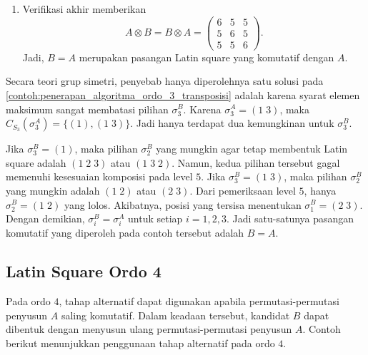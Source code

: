 \begin{contoh}
\begin{enumerate}
    \item Verifikasi akhir memberikan
          \[
            A\otimes B
            =
            B\otimes A
            =
            \begin{pmatrix}
              6 & 5 & 5 \\
              5 & 6 & 5 \\
              5 & 5 & 6
            \end{pmatrix}.
          \]
          Jadi, $B=A$ merupakan pasangan Latin square yang komutatif dengan $A$.
  \end{enumerate}
\end{contoh}

Secara teori grup simetri, penyebab hanya diperolehnya satu solusi pada \autoref{contoh:penerapan_algoritma_ordo_3_transposisi} adalah karena syarat elemen maksimum sangat membatasi pilihan $\sigma_3^B$. Karena $\sigma_3^A=(1\;3)$, maka $C_{S_3}(\sigma_3^A)=\{(1),(1\;3)\}$. Jadi hanya terdapat dua kemungkinan untuk $\sigma_3^B$.

Jika $\sigma_3^B=(1)$, maka pilihan $\sigma_2^B$ yang mungkin agar tetap membentuk Latin square adalah $(1\;2\;3)$ atau $(1\;3\;2)$. Namun, kedua pilihan tersebut gagal memenuhi kesesuaian komposisi pada level $5$. Jika $\sigma_3^B=(1\;3)$, maka pilihan $\sigma_2^B$ yang mungkin adalah $(1\;2)$ atau $(2\;3)$. Dari pemeriksaan level $5$, hanya $\sigma_2^B=(1\;2)$ yang lolos. Akibatnya, posisi yang tersisa menentukan $\sigma_1^B=(2\;3)$. Dengan demikian, $\sigma_i^B=\sigma_i^A$ untuk setiap $i=1,2,3$. Jadi satu-satunya pasangan komutatif yang diperoleh pada contoh tersebut adalah $B=A$.

\subsection{Latin Square Ordo 4}

Pada ordo $4$, tahap alternatif dapat digunakan apabila permutasi-permutasi
penyusun $A$ saling komutatif. Dalam keadaan tersebut, kandidat $B$ dapat
dibentuk dengan menyusun ulang permutasi-permutasi penyusun $A$. Contoh
berikut menunjukkan penggunaan tahap alternatif pada ordo $4$.

